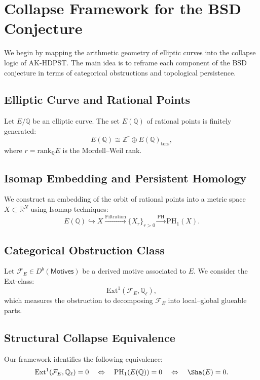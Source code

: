 \section{Collapse Framework for the BSD Conjecture}

We begin by mapping the arithmetic geometry of elliptic curves into the collapse logic of AK-HDPST. The main idea is to reframe each component of the BSD conjecture in terms of categorical obstructions and topological persistence.

\subsection{Elliptic Curve and Rational Points}

Let \( E/\mathbb{Q} \) be an elliptic curve. The set \( E(\mathbb{Q}) \) of rational points is finitely generated:
\[
E(\mathbb{Q}) \cong \mathbb{Z}^r \oplus E(\mathbb{Q})_{\text{tors}},
\]
where \( r = \mathrm{rank}_\mathbb{Q}E \) is the Mordell–Weil rank.

\subsection{Isomap Embedding and Persistent Homology}

We construct an embedding of the orbit of rational points into a metric space \( X \subset \mathbb{R}^N \) using Isomap techniques:
\[
E(\mathbb{Q}) \hookrightarrow X \xrightarrow{\mathrm{Filtration}} \{ X_r \}_{r > 0} \xrightarrow{\mathrm{PH}} \mathrm{PH}_1(X).
\]

\subsection{Categorical Obstruction Class}

Let \( \mathcal{F}_E \in D^b(\mathsf{Motives}) \) be a derived motive associated to \( E \).  
We consider the Ext-class:
\[
\mathrm{Ext}^1(\mathcal{F}_E, \mathbb{Q}_\ell),
\]
which measures the obstruction to decomposing \( \mathcal{F}_E \) into local–global glueable parts.

\subsection{Structural Collapse Equivalence}

Our framework identifies the following equivalence:
\[
\mathrm{Ext}^1(\mathcal{F}_E, \mathbb{Q}_\ell) = 0 \quad \Leftrightarrow \quad \mathrm{PH}_1(E(\mathbb{Q})) = 0 \quad \Leftrightarrow \quad \Sha(E) = 0.
\]

